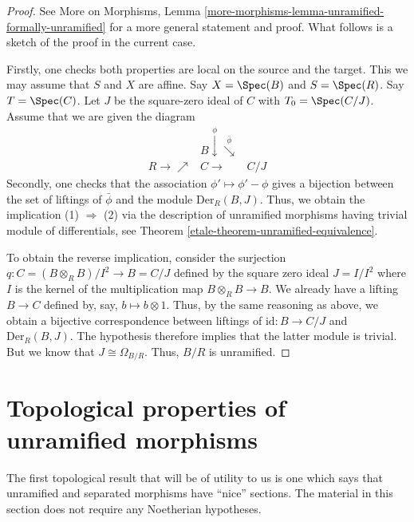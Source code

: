 \begin{proof}

See More on Morphisms,
Lemma \ref{more-morphisms-lemma-unramified-formally-unramified}
for a more general statement and proof.
What follows is a sketch of the proof in the current case.

\medskip\noindent
Firstly, one checks both properties are local on the source and the target.
This we may assume that $S$ and $X$ are affine.
Say $X = \Spec(B)$ and $S = \Spec(R)$.
Say $T = \Spec(C)$. Let $J$ be the square-zero ideal of $C$
with $T_0 = \Spec(C/J)$. Assume that we are given the diagram
$$
\begin{array}{ccc} & B \overset{\phi}{\downarrow}\overset{\bar{\phi}}{\searrow} &  \\ R \longrightarrow\nearrow & C \longrightarrow & C/J\end{array}
$$
Secondly, one checks that the association $\phi' \mapsto \phi' - \phi$
gives a bijection between the set of liftings of $\bar{\phi}$ and the module
$\text{Der}_R(B, J)$. Thus, we obtain the implication (1) $\Rightarrow$ (2)
via the description of unramified morphisms having trivial module
of differentials, see Theorem \ref{etale-theorem-unramified-equivalence}.

\medskip\noindent
To obtain the reverse implication, consider the surjection
$q : C = (B \otimes_R B)/I^2 \to B = C/J$ defined by the square zero ideal
$J = I/I^2$ where $I$ is the kernel of the multiplication map
$B \otimes_R B \to B$. We already have a lifting $B \to C$ defined by, say,
$b \mapsto b \otimes 1$. Thus, by the same reasoning as above, we obtain a
bijective correspondence between liftings of $\text{id} : B \to C/J$ and
$\text{Der}_R(B, J)$. The hypothesis therefore implies that the latter module is
trivial. But we know that $J \cong \Omega_{B/R}$. Thus, $B/R$ is unramified.
\end{proof}

\section{Topological properties of unramified morphisms}
\label{etale-section-topological-unramified}
The first topological result that will be of utility to us is one which says
that unramified and separated morphisms have ``nice'' sections.
The material in this section does not require any Noetherian hypotheses.

